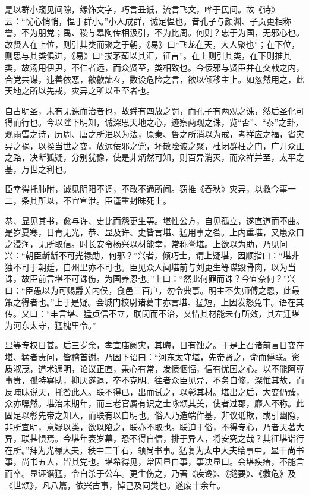 \documentclass[]{article}
\begin{document}
是以群小窥见间隙，缘饰文字，巧言丑诋，流言飞文，哗于民间。故《诗》云：``忧心悄悄，愠于群小。''小人成群，诚足愠也。昔孔子与颜渊、子贡更相称誉，不为朋党；禹、稷与皋陶传相汲引，不为比周。何则？忠于为国，无邪心也。故贤人在上位，则引其类而聚之于朝，《易》曰``飞龙在天，大人聚也''；在下位，则思与其类俱进，《易》曰``拔茅茹以其汇，征吉''。在上则引其类，在下则推其类，故汤用伊尹，不仁者远，而众贤至，类相致也。今佞邪与贤臣并在交戟之内，合党共谋，违善依恶，歙歙訿々，数设危险之言，欲以倾移主上。如忽然用之，此天地之所以先戒，灾异之所以重至者也。

自古明圣，未有无诛而治者也，故舜有四放之罚，而孔子有两观之诛，然后圣化可得而行也。今以陛下明知，诚深思天地之心，迹察两观之诛，览``否''、``泰''之卦，观雨雪之诗，历周、唐之所进以为法，原秦、鲁之所消以为戒，考祥应之福，省灾异之祸，以揆当世之变，放远佞邪之党，坏散险诐之聚，杜闭群枉之门，广开众正之路，决断狐疑，分别犹豫，使是非炳然可知，则百异消灭，而众祥并至，太平之基，万世之利也。

臣幸得托肺附，诚见阴阳不调，不敢不通所闻。窃推《春秋》灾异，以救今事一二，条其所以，不宜宣泄。臣谨重封昧死上。

恭、显见其书，愈与许、史比而怨更生等。堪性公方，自见孤立，遂直道而不曲。是岁夏寒，日青无光，恭、显及许、史皆言堪、猛用事之咎。上内重堪，又患众口之浸润，无所取信。时长安令杨兴以材能幸，常称誉堪。上欲以为助，乃见问兴：``朝臣龂龂不可光禄勋，何邪？''兴者，倾巧士，谓上疑堪，因顺指曰：``堪非独不可于朝廷，自州里亦不可也。臣见众人闻堪前与刘更生等谋毁骨肉，以为当诛，故臣前言堪不可诛伤，为国养恩也。''上曰：``然此何罪而诛？今宜奈何？''兴曰：``臣愚以为可赐爵关内侯，食邑三百户，勿令典事。明主不失师傅之恩，此最策之得者也。''上于是疑。会城门校尉诸葛丰亦言堪、猛短，上因发怒免丰。语在其传。又曰：``丰言堪、猛贞信不立，联闵而不治，又惜其材能未有所效，其左迁堪为河东太守，猛槐里令。''

显等专权日甚。后三岁余，孝宣庙阙灾，其晦，日有蚀之。于是上召诸前言日变在堪、猛者责问，皆稽首谢。乃因下诏曰：``河东太守堪，先帝贤之，命而傅联。资质淑茂，道术通明，论议正直，秉心有常，发愤悃愊，信有忧国之心。以不能阿尊事贵，孤特寡助，抑厌遂退，卒不克明。往者众臣见异，不务自修，深惟其故，而反晻昧说天，托咎此人。联不得已，出而试之，以彰其材。堪出之后，大变仍臻，众亦嘿然。堪治未期年，而三老官属有识之士咏颂其美，使者过郡，靡人不称。此固足以彰先帝之知人，而联有以自明也。俗人乃造端作基，非议诋欺，或引幽隐，非所宜明，意疑以类，欲以陷之，联亦不取也。联迫于俗，不得专心，乃者天著大异，联甚惧焉。今堪年衰岁幕，恐不得自信，排于异人，将安究之哉？其征堪诣行在所。''拜为光禄大夫，秩中二千石，领尚书事。猛复为太中大夫给事中。显干尚书事，尚书五人，皆其党也。堪希得见，常因显白事，事决显口。会堪疾瘖，不能言而卒。显诬谮猛，令自杀于公车。更生伤之，乃著《疾谗》、《擿要》、《救危》及《世颂》，凡八篇，依兴古事，悼己及同类也。遂废十余年。
\end{document}

